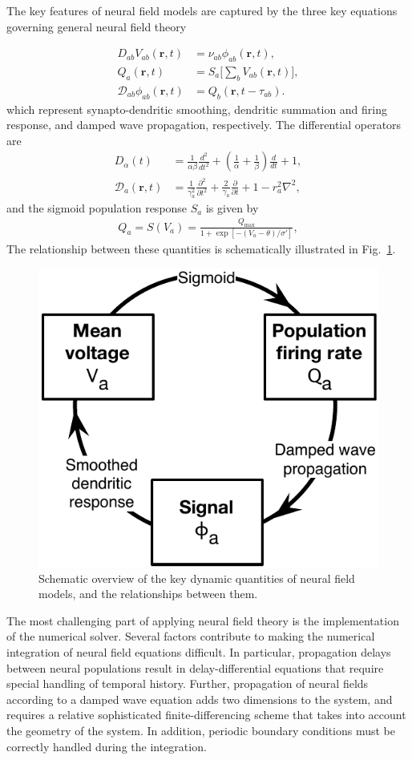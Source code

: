 \documentclass[preprint,review,10pt,authoryear,letterpaper]{elsarticle}
\begin{document}
The key features of neural field models are captured by the three key equations governing general neural field theory

\begin{align}
	D_{ab}V_{ab}(\mathbf{r},t) &= \nu_{ab}\phi_{ab}(\mathbf{r},t),\\
			Q_a(\mathbf{r},t) &= S_a \big[\sum_b V_{ab}(\mathbf{r},t) \big],\\
	\mathcal{D}_{ab}\phi_{ab}(\mathbf{r},t) &= Q_b(\mathbf{r},t-\tau_{ab}).
\end{align}
which represent synapto-dendritic smoothing, dendritic summation and firing response, and damped wave propagation, respectively. The differential operators are
\begin{align}
\label{eq:dendrite}
	D_\alpha(t) &= \frac{1}{\alpha\beta}\frac{d^2}{dt^2} + \left( \frac{1}{\alpha} + \frac{1}{\beta}\right) \frac{d}{dt}+1,\\
\label{eq:wave}
	\mathcal{D}_a(\mathbf{r},t) &= \frac{1}{\gamma_a^2}\frac{\partial^2}{\partial t^2} + \frac{2}{\gamma_a}\frac{\partial}{\partial t} + 1 - r_a^2\nabla^2,
\end{align}
and the sigmoid population response $S_a$ is given by
\begin{align}
\label{eq:sigmoid}
	Q_a = S(V_a) = \frac{Q_{\textrm{max}}}{1+\exp[-(V_a - \theta)/\sigma']},
\end{align}
The relationship between these quantities is schematically illustrated in Fig.~\ref{fig:eirs_cycle}.

\begin{figure}[!b]
\begin{center}
\includegraphics[width=0.40\columnwidth]{EIRS_cycle}
\caption{Schematic overview of the key dynamic quantities of neural field models, and the relationships between them.}
\label{fig:eirs_cycle}
\end{center}
\end{figure}

The most challenging part of applying neural field theory is the implementation of the numerical solver. Several factors contribute to making the numerical integration of neural field equations difficult. In particular, propagation delays between neural populations result in delay-differential equations that require special handling of temporal history. Further, propagation of neural fields according to a damped wave equation adds two dimensions to the system, and requires a relative sophisticated finite-differencing scheme that takes into account the geometry of the system. In addition, periodic boundary conditions must be correctly handled during the integration. 
\end{document}
